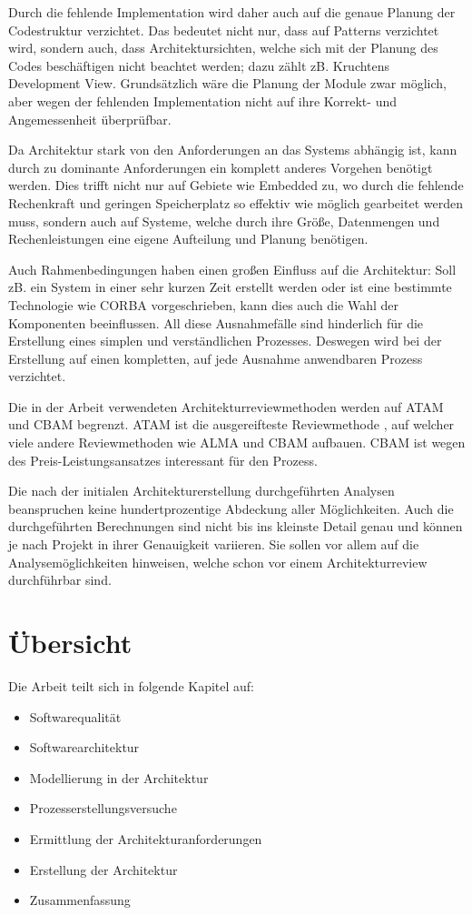 Durch die fehlende Implementation wird daher auch auf die genaue Planung der Codestruktur verzichtet. Das bedeutet nicht nur, dass auf Patterns verzichtet wird, sondern auch, dass Architektursichten, welche sich mit der Planung des Codes beschäftigen nicht beachtet werden; dazu zählt zB. Kruchtens Development View. Grundsätzlich wäre die Planung der Module zwar möglich, aber wegen der fehlenden Implementation nicht auf ihre Korrekt- und Angemessenheit überprüfbar.

Da Architektur stark von den Anforderungen an das Systems abhängig ist, kann durch zu dominante Anforderungen ein komplett anderes Vorgehen benötigt werden. Dies trifft nicht nur auf Gebiete wie Embedded zu, wo durch die fehlende Rechenkraft und geringen Speicherplatz so effektiv wie möglich gearbeitet werden muss, sondern auch auf Systeme, welche durch ihre Größe, Datenmengen und Rechenleistungen eine eigene Aufteilung und Planung benötigen.

Auch Rahmenbedingungen haben einen großen Einfluss auf die Architektur: Soll zB. ein System in einer sehr kurzen Zeit erstellt werden oder ist eine bestimmte Technologie wie CORBA vorgeschrieben, kann dies auch die Wahl der Komponenten beeinflussen. All diese Ausnahmefälle sind hinderlich für die Erstellung eines simplen und verständlichen Prozesses. Deswegen wird bei der Erstellung auf einen kompletten, auf jede Ausnahme anwendbaren Prozess verzichtet.

Die in der Arbeit verwendeten Architekturreviewmethoden werden auf ATAM und CBAM begrenzt. ATAM ist die ausgereifteste Reviewmethode \cite[S. 184]{basiswissen}, auf welcher viele andere Reviewmethoden wie ALMA und CBAM aufbauen. CBAM ist wegen des Preis-Leistungsansatzes interessant für den Prozess.

Die nach der initialen Architekturerstellung durchgeführten Analysen beanspruchen keine hundertprozentige Abdeckung aller Möglichkeiten. Auch die durchgeführten Berechnungen sind nicht bis ins kleinste Detail genau und können je nach Projekt in ihrer Genauigkeit variieren. Sie sollen vor allem auf die Analysemöglichkeiten hinweisen, welche schon vor einem  Architekturreview durchführbar sind.

\section{Übersicht}
Die Arbeit teilt sich in folgende Kapitel auf:

\begin{itemize}
  \item Softwarequalität
  \item Softwarearchitektur
  \item Modellierung in der Architektur
  \item Prozesserstellungsversuche
  \item Ermittlung der Architekturanforderungen
  \item Erstellung der Architektur
  \item Zusammenfassung
\end{itemize}


